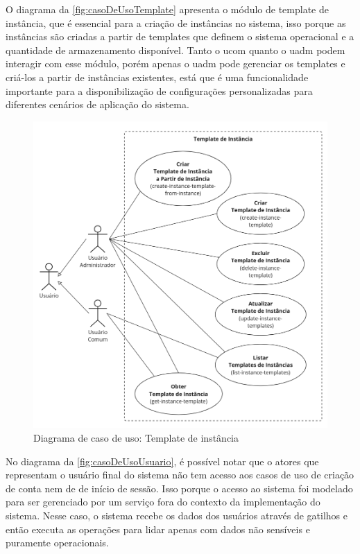 O diagrama da \autoref{fig:casoDeUsoTemplate} apresenta o módulo de template de instância, que é essencial para a criação de instâncias no sistema, isso porque as instâncias são criadas a partir de templates que definem o sistema operacional e a quantidade de armazenamento disponível. Tanto o \gls{ucom} quanto o \gls{uadm} podem interagir com esse módulo, porém apenas o \gls{uadm} pode gerenciar os templates e criá-los a partir de instâncias existentes, está que é uma funcionalidade importante para a disponibilização de configurações personalizadas para diferentes cenários de aplicação do sistema.

\begin{figure}[H]
\caption{Diagrama de caso de uso: Template de instância}
\label{fig:casoDeUsoTemplate}
\includegraphics[width=\textwidth]{capitulos/2-metodologia/files/use-case-instance-template.png}
\end{figure}

No diagrama da \autoref{fig:casoDeUsoUsuario}, é possível notar que o atores que representam o usuário final do sistema não tem acesso aos casos de uso de criação de conta nem de de início de sessão. Isso porque o acesso ao sistema foi modelado para ser gerenciado por um serviço fora do contexto da implementação do sistema. Nesse caso, o sistema recebe os dados dos usuários através de gatilhos e então executa as operações para lidar apenas com dados não sensíveis e puramente operacionais.

